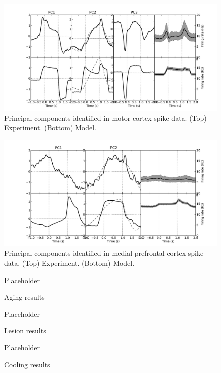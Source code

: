 \documentclass[12pt]{article}
\begin{document}
\clearpage

\begin{figure}
  \centering
    \includegraphics[width=\columnwidth]{f6-mcpca}
    \caption{Principal components identified in motor cortex
      spike data. (Top) Experiment. (Bottom) Model.}
\end{figure}

\clearpage

\begin{figure}
  \centering
    \includegraphics[width=\columnwidth]{f7-pfcpca}
    \caption{Principal components identified in medial prefrontal
      cortex spike data. (Top) Experiment. (Bottom) Model.}
\end{figure}

\clearpage

\begin{figure}
  \centering
    Placeholder
    \caption{Aging results}
\end{figure}

\clearpage

\begin{figure}
  \centering
    Placeholder
    \caption{Lesion results}
\end{figure}

\clearpage

\begin{figure}
  \centering
    Placeholder
    \caption{Cooling results}
\end{figure}
\end{document}
